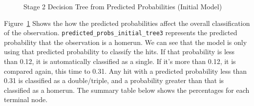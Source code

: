 \documentclass[
  letterpaper,
  DIV=11,
  numbers=noendperiod]{scrartcl}
\begin{document}
\begin{figure}[H]


\caption{\label{fig-init-pred-dectree}Stage 2 Decision Tree from
Predicted Probabilities (Initial Model)}

\end{figure}%

Figure~\ref{fig-init-pred-dectree} Shows the how the predicted
probabilities affect the overall classification of the observation.
\texttt{predicted\_probs\_initial\_tree3} represents the predicted
probability that the observation is a homerun. We can see that the model
is only using that predicted probability to classify the hits. If that
probability is less than 0.12, it is automatically classified as a
single. If it's more than 0.12, it is compared again, this time to 0.31.
Any hit with a predicted probability less than 0.31 is classified as a
double/triple, and a probability greater than that is classified as a
homerun. The summary table below shows the percentages for each terminal
node.
\end{document}
